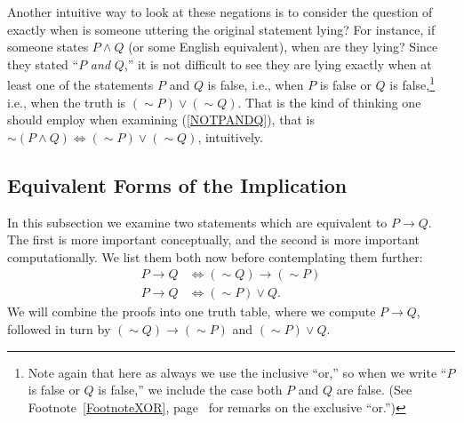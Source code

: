 Another intuitive way to look at these negations is to consider
the question of exactly when is someone uttering the original
statement lying?  For instance, if someone states
$P\wedge Q$ (or some English equivalent), when are they lying?
Since they stated ``$P$ \emph{and} $Q$,'' it is not difficult
to see they are lying exactly when at least
one of the statements $P$ and $Q$ is
false, i.e., when $P$ is false or $Q$ is false,\footnote{
Note again that here as always we use the inclusive ``or,'' so when we write
``$P$ is false or $Q$ is false,'' we include the case
both $P$ and $Q$ are false. (See Footnote~\ref{FootnoteXOR},
page~\pageref{FootnoteXOR} for remarks on the exclusive ``or.'')
} 
i.e., when the truth is $(\sim P)\vee(\sim Q)$.
That is the kind of thinking one should employ when 
examining (\ref{NOTPANDQ}), that is
$\sim(P\wedge Q)\iff(\sim P)\vee(\sim Q)$, intuitively.

\subsection{Equivalent Forms of the Implication}
In this subsection we examine two statements which
are equivalent to $P\longrightarrow Q$.  The first is
more important conceptually, and the second is more
important computationally.  
We list them both now before contemplating them further:
\begin{align}
P\longrightarrow Q&\iff(\sim Q)\longrightarrow(\sim P)
     \label{CONTRAPOSITIVE}\\
P\longrightarrow Q&\iff(\sim P)\vee Q.\label{ALTFORMOFIMPLICATION}
\end{align}
We will combine the proofs into one truth table, where we
compute $P\longrightarrow Q$, followed in turn by
$(\sim Q)\longrightarrow (\sim P)$ and $(\sim P)\vee Q$.
\medskip

